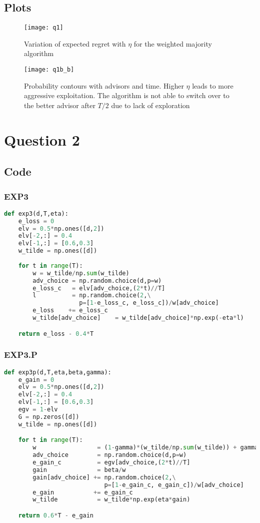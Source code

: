 \documentclass{article}
\begin{document}
\subsection*{Plots}
\begin{figure}[h!]
\centering
\texttt{[image: q1]}
\caption{Variation of expected regret with $\eta$ for the weighted majority algorithm}
\end{figure}

\begin{figure}[h!]
\centering
\texttt{[image: q1b\_b]}
\caption{Probability contours with advisors and time. Higher $\eta$ leads to more aggressive exploitation. The algorithm is not able to switch over to the better advisor after $T/2$ due to lack of exploration}
\end{figure}

\newpage

\section*{Question 2}
\subsection*{Code}
\subsubsection*{EXP3}
\begin{lstlisting}[language=python]
def exp3(d,T,eta):
    e_loss = 0
    elv = 0.5*np.ones([d,2])
    elv[-2,:] = 0.4
    elv[-1,:] = [0.6,0.3]
    w_tilde = np.ones([d])
    
    for t in range(T):
        w = w_tilde/np.sum(w_tilde)
        adv_choice = np.random.choice(d,p=w)
        e_loss_c   = elv[adv_choice,(2*t)//T]
        l          = np.random.choice(2,\
                     p=[1-e_loss_c, e_loss_c])/w[adv_choice]
        e_loss    += e_loss_c
        w_tilde[adv_choice]    = w_tilde[adv_choice]*np.exp(-eta*l)

    return e_loss - 0.4*T
\end{lstlisting}
\subsubsection*{EXP3.P}
\begin{lstlisting}[language=python]
def exp3p(d,T,eta,beta,gamma):
    e_gain = 0
    elv = 0.5*np.ones([d,2])
    elv[-2,:] = 0.4
    elv[-1,:] = [0.6,0.3]
    egv = 1-elv
    G = np.zeros([d])
    w_tilde = np.ones([d])

    for t in range(T):
        w                 = (1-gamma)*(w_tilde/np.sum(w_tilde)) + gamma/d
        adv_choice        = np.random.choice(d,p=w)
        e_gain_c          = egv[adv_choice,(2*t)//T]
        gain              = beta/w
        gain[adv_choice] += np.random.choice(2,\
                            p=[1-e_gain_c, e_gain_c])/w[adv_choice]
        e_gain           += e_gain_c
        w_tilde           = w_tilde*np.exp(eta*gain)

    return 0.6*T - e_gain
\end{lstlisting}
\newpage
\end{document}
